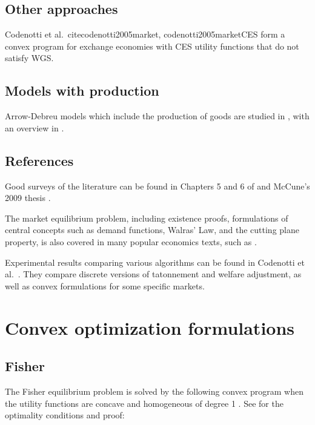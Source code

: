\documentclass[12pt]{article}
\begin{document}
\subsection{Other approaches}
Codenotti et al.\ cite{codenotti2005market, codenotti2005marketCES} form a
convex program for exchange economies with CES utility functions that do not
satisfy WGS.

\subsection{Models with production}
Arrow-Debreu models which include the production of goods are studied
in \cite{garg2014computability,jain2005market,codenotti2005marketExcess},
with an overview in \cite[Chapters~5--6]{nisan2007algorithmic}.

\subsection{References}
Good surveys of the literature can be found in Chapters 5 and 6 of
\cite{nisan2007algorithmic} and McCune's 2009 thesis \cite{mccune2009algorithmic}.

The market equilibrium problem, including existence proofs, formulations of
central concepts such as demand functions, Walras' Law, and the cutting plane
property, is also covered in many popular economics texts, such as
\cite{varian1992microeconomic, mas1995microeconomic,
luenberger1995microeconomic, kreps1990course}.

Experimental results comparing various algorithms can be found in Codenotti
et al.\ \cite{codenotti2008experimental}.
They compare discrete versions of tatonnement and welfare adjustment,
as well as convex formulations for some specific markets.


\section{Convex optimization formulations}


\subsection{Fisher}

The Fisher equilibrium problem is solved by the following convex program
when the utility functions are concave and homogeneous of degree 1
\cite{eisenberg1959consensus, gale1960theory, eisenberg1961aggregation}.
See \cite[Section~6.2]{nisan2007algorithmic} for the optimality conditions
and proof:
\end{document}
